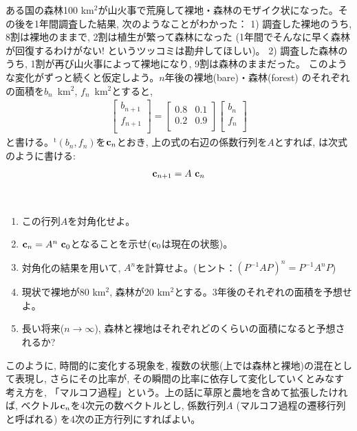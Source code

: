 \begin{exmpl}ある国の森林100$\,\,$km$^2$が山火事で荒廃して裸地・森林のモザイク状になった。その後を1年間調査した結果, 次のようなことがわかった：
1) 調査した裸地のうち, 8割は裸地のままで, 2割は植生が繁って森林になった
{\small (1年間でそんなに早く森林が回復するわけがない! というツッコミは勘弁してほしい)}。
2) 調査した森林のうち, 1割が再び山火事によって裸地になり, 9割は森林のままだった。
このような変化がずっと続くと仮定しよう。$n$年後の裸地(bare)・森林(forest)
のそれぞれの面積を$b_n$~km$^2$, $f_n$~km$^2$とすると, 
\begin{eqnarray}
\begin{bmatrix}
b_{n+1}\\
f_{n+1}\\
\end{bmatrix}=
\begin{bmatrix}
0.8 & 0.1\\
0.2 & 0.9\\
\end{bmatrix}
\begin{bmatrix}
b_n\\
f_n\\
\end{bmatrix}\label{eq:matrix_Markov3}
\end{eqnarray}
と書ける。$^\text{t}(b_n, f_n)$を${\bf c}_n$とおき, 上の式の右辺の係数行列を$A$とすれば, 
は次式のように書ける:
\begin{eqnarray} 
{\bf c}_{n+1}=A{~}{\bf c}_n
\end{eqnarray}
\end{exmpl}

\begin{q}\label{q:mtrix_exm_mMrkov}　
\begin{enumerate}
\item この行列$A$を対角化せよ。
\item ${\bf c}_n=A^n{~}{\bf c}_0$となることを示せ(${\bf c}_0$は現在の状態)。
\item 対角化の結果を用いて, $A^n$を計算せよ。(ヒント：$(P^{-1}AP)^n=P^{-1}A^nP$)
\item 現状で裸地が80$\,\,$km$^2$, 森林が20$\,\,$km$^2$とする。3年後のそれぞれの面積を予想せよ。
\item 長い将来($n \rightarrow \infty$), 森林と裸地はそれぞれどのくらいの面積になると予想されるか?
\end{enumerate}
\end{q}

このように, 時間的に変化する現象を, 複数の状態(上では森林と裸地)の混在として表現し, 
さらにその比率が, その瞬間の比率に依存して変化していくとみなす考え方を, 「マルコフ過程」という。上の話に草原と農地を含めて拡張したければ, 
ベクトル${\bf c}_n$を4次元の数ベクトルとし, 
係数行列$A$ (マルコフ過程の遷移行列と呼ばれる)
を4次の正方行列にすればよい。
\mv

